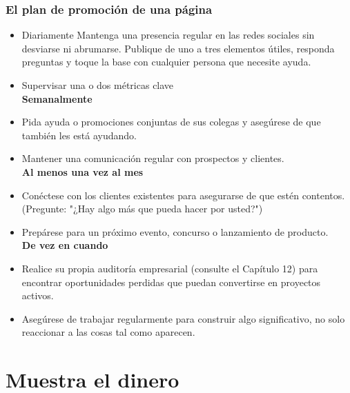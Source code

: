 \documentclass[10pt]{book}
\begin{document}
	\subsection{El plan de promoción de una página}
	\begin{itemize} 
	    \item Diariamente Mantenga una presencia regular en las redes sociales sin desviarse ni abrumarse. Publique de uno a tres elementos útiles, responda preguntas y toque la base con cualquier persona que necesite ayuda.
	    \item Supervisar una o dos métricas clave\\
	\textbf{Semanalmente}
	    \item Pida ayuda o promociones conjuntas de sus colegas y asegúrese de que también les está ayudando.
	    \item Mantener una comunicación regular con prospectos y clientes.\\
	\textbf{Al menos una vez al mes}
	    \item Conéctese con los clientes existentes para asegurarse de que estén contentos. (Pregunte: "¿Hay algo más que pueda hacer por usted?")
	    \item Prepárese para un próximo evento, concurso o lanzamiento de producto.\\
	\textbf{De vez en cuando}
	    \item Realice su propia auditoría empresarial (consulte el Capítulo 12) para encontrar oportunidades perdidas que puedan convertirse en proyectos activos.
	    \item Asegúrese de trabajar regularmente para construir algo significativo, no solo reaccionar a las cosas tal como aparecen.
	\end{itemize}

\chapter{Muestra el dinero}
\end{document}
